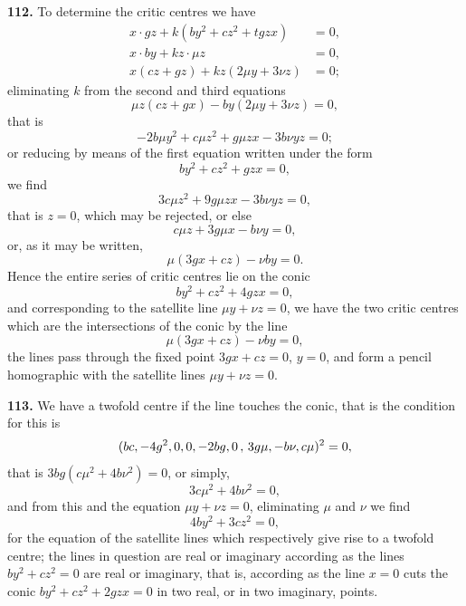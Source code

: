 \documentclass[11pt,a4paper]{article}
\theoremstyle{plain}
\begin{document}
\noindent\textbf{112.} To determine the critic centres we have
\begin{align*}
x \cdot gz + k(by^2 + cz^2 + tgzx) &= 0,\\
x \cdot by + kz \cdot \mu z &= 0,\\
x(cz + gz) + kz(2\mu y + 3\nu z) &= 0;
\end{align*}
eliminating $k$ from the second and third equations
\[
\mu z(cz + gx) - by(2\mu y + 3\nu z) = 0,
\]
that is
\[
-2b\mu y^2 + c\mu z^2 + g\mu zx - 3b\nu yz = 0;
\]
or reducing by means of the first equation written under the form
\[
by^2 + cz^2 + gzx = 0,
\]
we find
\[
3c\mu z^2 + 9g\mu zx - 3b\nu yz = 0,
\]
that is $z = 0$, which may be rejected, or else
\[
c\mu z + 3g\mu x - b\nu y = 0,
\]
or, as it may be written,
\[
\mu(3gx + cz) - \nu by = 0.
\]
Hence the entire series of critic centres lie on the conic
\[
by^2 + cz^2 + 4gzx = 0,
\]
and corresponding to the satellite line $\mu y + \nu z = 0$, we have the two critic centres which are the intersections of the conic by the line
\[
\mu(3gx + cz) - \nu by = 0,
\]
the lines pass through the fixed point $3gx + cz = 0$, $y = 0$, and form a pencil homographic with the satellite lines $\mu y + \nu z = 0$.

\noindent\textbf{113.} We have a twofold centre if the line touches the conic, that is the condition for this is
\[
(bc, -4g^2, 0, 0, -2bg, 0 \, \char`\,\, 3g\mu, -b\nu, c\mu)^2 = 0,
\]
that is $3bg(c\mu^2 + 4b\nu^2) = 0$, or simply,
\[
3c\mu^2 + 4b\nu^2 = 0,
\]
and from this and the equation $\mu y + \nu z = 0$, eliminating $\mu$ and $\nu$ we find
\[
4by^2 + 3cz^2 = 0,
\]
for the equation of the satellite lines which respectively give rise to a twofold centre; the lines in question are real or imaginary according as the lines $by^2 + cz^2 = 0$ are real or imaginary, that is, according as the line $x = 0$ cuts the conic $by^2 + cz^2 + 2gzx = 0$ in two real, or in two imaginary, points.
\end{document}
